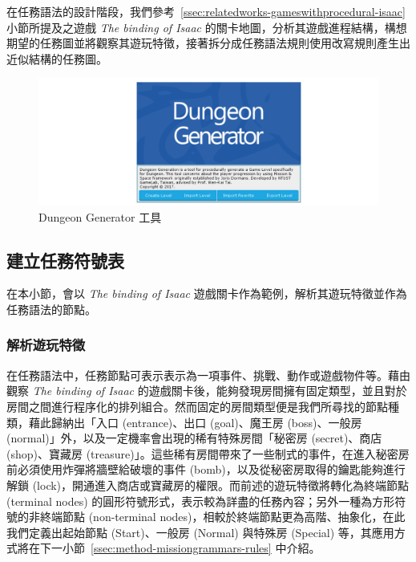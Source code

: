 在任務語法的設計階段，我們參考~\ref{ssec:relatedworks-gameswithprocedural-isaac} 小節所提及之遊戲 \textit{The binding of Isaac} 的關卡地圖，分析其遊戲進程結構，構想期望的任務圖並將觀察其遊玩特徵，接著拆分成任務語法規則使用改寫規則產生出近似結構的任務圖。

\begin{figure}[ht]
  \begin{center}
    \includegraphics[width=1.0\textwidth]{figures/Dungeon_Generator_工具.png}
    \caption{Dungeon Generator 工具} 
    \label{fig:dungeon-generator}
  \end{center}
\end{figure}

\subsection{建立任務符號表}
\label{ssec:method-missiongrammars-alphabet}

在本小節，會以 \textit{The binding of Isaac} 遊戲關卡作為範例，解析其遊玩特徵並作為任務語法的節點。

\subsubsection{解析遊玩特徵}
\label{sssec:method-missiongrammars-alphabet-extractpatterns}

在任務語法中，任務節點可表示表示為一項事件、挑戰、動作或遊戲物件等。藉由觀察 \textit{The binding of Isaac} 的遊戲關卡後，能夠發現房間擁有固定類型，並且對於房間之間進行程序化的排列組合。然而固定的房間類型便是我們所尋找的節點種類，藉此歸納出「入口 (entrance)、出口 (goal)、魔王房 (boss)、一般房 (normal)」外，以及一定機率會出現的稀有特殊房間「秘密房 (secret)、商店 (shop)、寶藏房 (treasure)」。這些稀有房間帶來了一些制式的事件，在進入秘密房前必須使用炸彈將牆壁給破壞的事件 (bomb)，以及從秘密房取得的鑰匙能夠進行解鎖 (lock)，開通進入商店或寶藏房的權限。而前述的遊玩特徵將轉化為終端節點 (terminal nodes) 的圓形符號形式，表示較為詳盡的任務內容；另外一種為方形符號的非終端節點 (non-terminal nodes)，相較於終端節點更為高階、抽象化，在此我們定義出起始節點 (Start)、一般房 (Normal) 與特殊房 (Special) 等，其應用方式將在下一小節~\ref{ssec:method-missiongrammars-rules} 中介紹。


